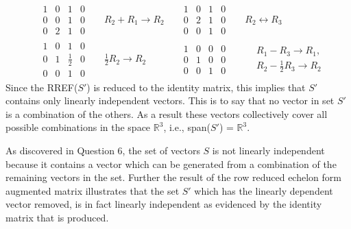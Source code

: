 \documentclass{report}
\begin{document}
\begin{align*}
    &\begin{array}{ccc|c}
        1 & 0 & 1 & 0 \\
        0 & 0 & 1 & 0 \\
        0 & 2 & 1 & 0
    \end{array}
    && R_2 + R_1 \rightarrow R_2
    &&\begin{array}{ccc|c}
        1 & 0 & 1 & 0 \\
        0 & 2 & 1 & 0 \\
        0 & 0 & 1 & 0
    \end{array}
    && R_2 \leftrightarrow R_3 \\
    &\begin{array}{ccc|c}
        1 & 0 & 1 & 0 \\
        0 & 1 & \frac{1}{2} & 0 \\
        0 & 0 & 1 & 0
    \end{array}
    && \frac{1}{2}R_2 \rightarrow R_2
    &&\begin{array}{ccc|c}
        1 & 0 & 0 & 0 \\
        0 & 1 & 0 & 0 \\
        0 & 0 & 1 & 0
    \end{array}
    && \begin{aligned} & R_1 - R_3 \rightarrow R_1, \\ & R_2 - \frac{1}{2}R_3 \rightarrow R_2 \end{aligned}
\end{align*}
Since the RREF($S'$) is reduced to the identity matrix, this implies that $S'$ contains only linearly independent vectors. This is to say that no vector in set $S'$ is a combination of the others. As a result these vectors collectively cover all possible combinations in the space $\mathbb{R}^3$, i.e., span($S'$) = $\mathbb{R}^3$.
\begin{note}
As discovered in Question 6, the set of vectors $S$ is not linearly independent because it contains a vector which can be generated from a combination of the remaining vectors in the set. Further the result of the row reduced echelon form augmented matrix illustrates that the set $S'$ which has the linearly dependent vector removed, is in fact linearly independent as evidenced by the identity matrix that is produced.
\end{note}
\end{document}
